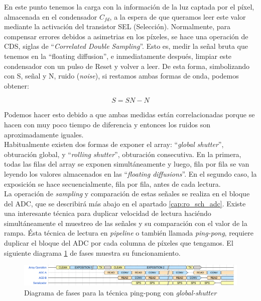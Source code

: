 En este punto tenemos la carga con la información de la luz captada por el píxel,
almacenada en el condensador $C_{fd}$, a la espera de que queramos leer este valor
mediante la activación del transistor SEL (Selección). Normalmente, para compensar
errores debidos a asimetrias en los píxeles, se hace una operación de CDS, siglas de
``\textit{Correlated Double Sampling}''. Esto es, medir la señal bruta que tenemos
en la ``floating diffusion'', e inmediatamente después, limpiar este condensador con
un pulso de Reset y volver a leer. De esta forma, simbolizando con S, señal y N,
ruido (\textit{noise}), si restamos ambas formas de onda, podemos obtener:

\begin{equation}
	\label{eq:CDS_operation}
	S = SN - N
\end{equation}

Podemos hacer esto debido a que ambas medidas  están correlacionadas porque se
hacen con muy poco tiempo de diferencia y entonces los ruidos son aproximadamente
iguales.\\

Habitualmente existen dos formas de exponer el array: ``\textit{global shutter}'',
obturación global, y ``\textit{rolling shutter}'', obturación consecutiva. En la
primera, todas las filas del array se exponen simultáneamente y luego, fila por fila
se van leyendo los valores almacenados en las ``\textit{floating diffusions}''. En
el segundo caso, la exposición se hace secuencialmente, fila por fila, antes de cada
lectura.\\

La operación de \textit{sampling} y comparación de estas señales se realiza en el
bloque del ADC, que se describirá más abajo en el apartado \ref{cap:ro_sch_adc}.
Existe una interesante técnica para duplicar velocidad de lectura haciéndo
simultáneamente el muestreo de las señales y su comparación con el valor de la rampa.
Ésta técnica de lectura en \textit{pipeline} o también llamada \textit{ping-pong},
requiere duplicar el bloque del ADC por cada columna de píxeles que tengamos. El
siguiente diagrama \ref{fig:ping_pong} de fases muestra su funcionamiento.\\

\begin{figure}[h]
	\centering
	\includegraphics[width=\textwidth]{img/ping-pong_wave.png}
	\caption{Diagrama de fases para la técnica ping-pong con \textit{global-shutter}}
	\label{fig:ping_pong}
\end{figure}


